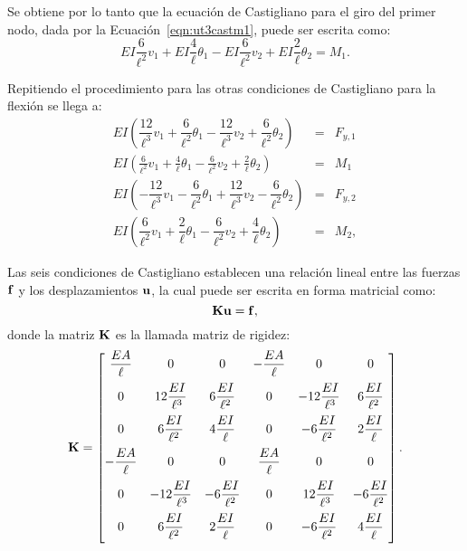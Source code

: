 Se obtiene por lo tanto que la ecuación de Castigliano para el giro del primer nodo, dada por la Ecuación~\eqref{eqn:ut3castm1}, puede ser escrita como:
%
\begin{equation}
	EI \frac{6}{\ell^2} v_1 +  EI \frac{4}{\ell} \theta_1 - EI \frac{6}{\ell^2} v_2 +    EI \frac{2}{\ell} \theta_2 = M_1.
\end{equation}


Repitiendo el procedimiento para las otras condiciones de Castigliano para la flexión se llega a:
%
\begin{eqnarray}
	EI \left( \dfrac{12}{\ell^{3}} v_1 + \dfrac{6}{\ell^{2}} \theta_1 - \dfrac{12}{\ell^{3}} v_2 + \dfrac{6}{\ell^{2}} \theta_2 \right)  &=& F_{y,1} \\
	EI \left( \frac{6}{\ell^2} v_1 +  \frac{4}{\ell} \theta_1 - \frac{6}{\ell^2} v_2   + \frac{2}{\ell} \theta_2 \right) &=& M_1 \\
	EI \left( -\dfrac{12}{\ell^{3}} v_1 - \dfrac{6}{\ell^{2}} \theta_1 +\dfrac{12}{\ell^{3}} v_2 - \dfrac{6}{\ell^{2}} \theta_2 \right) &=& F_{y,2} \\
	EI \left( \dfrac{6}{\ell^{2}} v_1 + \dfrac{2}{\ell} \theta_1 - \dfrac{6}{\ell^{2}} v_2 + \dfrac{4}{\ell}  \theta_2 \right) &=& M_2,
\end{eqnarray}
%



Las seis condiciones de Castigliano establecen una relación lineal entre las fuerzas ${\bf f}$ y los desplazamientos ${\bf u}$, la cual puede ser escrita en forma matricial como:
%
\begin{equation}\label{eqn:eqrig}
	{\bf K} {\bf u} = {\bf f},
\end{equation}
%
donde la matriz ${\bf K}$ es la llamada matriz de rigidez:
%
\begin{equation}
	{\bf K} = \left[
	\begin{matrix}
		\dfrac{EA}{\ell} & 0 & 0 & - \dfrac{EA}{\ell} & 0 & 0 \\[3mm]
		0 &  12 \dfrac{EI}{\ell^{3}} & 6 \dfrac{EI}{\ell^{2}} &  0& -12 \dfrac{EI}{\ell^{3}} & 6 \dfrac{EI}{\ell^{2}} \\[3mm]
		0 &  6 \dfrac{EI}{\ell^{2}} & 4 \dfrac{EI}{\ell} & 0& -6 \dfrac{EI}{\ell^{2}} & 2 \dfrac{EI}{\ell} \\[3mm]
		-\dfrac{EA}{\ell} & 0 & 0 &  \dfrac{EA}{\ell} & 0 & 0 \\[3mm]
		0 &  -12 \dfrac{EI}{\ell^{3}} & -6 \dfrac{EI}{\ell^{2}} &0&  12 \dfrac{EI}{\ell^{3}} & -6 \dfrac{EI}{\ell^{2}} \\[3mm]
		0 &  6 \dfrac{EI}{\ell^{2}} & 2 \dfrac{EI}{\ell} & 0 & -6 \dfrac{EI}{\ell^{2}} & 4 \dfrac{EI}{\ell} \\[3mm]
	\end{matrix}
	\right].
\end{equation}


